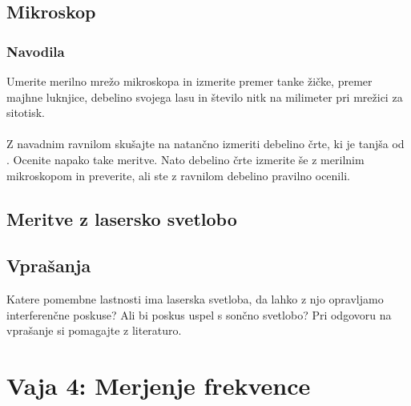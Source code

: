 \documentclass{report}
\begin{document}
\pagebreak
\section{Mikroskop}
\subsection{Navodila}
 Umerite merilno mrežo mikroskopa in izmerite premer tanke žičke, premer majhne
luknjice, debelino svojega lasu in število nitk na milimeter pri mrežici za sitotisk.\\\\
  Z navadnim ravnilom skušajte na  natančno izmeriti debelino črte, ki
je tanjša od . Ocenite napako take meritve. Nato debelino črte izmerite še z merilnim
mikroskopom in preverite, ali ste z ravnilom debelino pravilno ocenili.

\pagebreak
\section{Meritve z lasersko svetlobo}


\pagebreak

\section{Vprašanja}
Katere pomembne lastnosti ima laserska svetloba, da lahko z njo opravljamo interferenčne
poskuse? Ali bi poskus uspel s sončno svetlobo? Pri odgovoru na vprašanje si pomagajte
z literaturo.

\chapter{Vaja 4: Merjenje frekvence}
\end{document}
